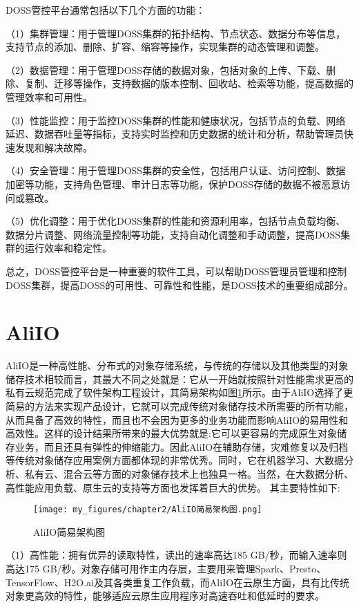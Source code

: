 DOSS管控平台通常包括以下几个方面的功能：

（1）集群管理：用于管理DOSS集群的拓扑结构、节点状态、数据分布等信息，支持节点的添加、删除、扩容、缩容等操作，实现集群的动态管理和调整。

（2）数据管理：用于管理DOSS存储的数据对象，包括对象的上传、下载、删除、复制、迁移等操作，支持数据的版本控制、回收站、检索等功能，提高数据的管理效率和可用性。

（3）性能监控：用于监控DOSS集群的性能和健康状况，包括节点的负载、网络延迟、数据吞吐量等指标，支持实时监控和历史数据的统计和分析，帮助管理员快速发现和解决故障。

（4）安全管理：用于管理DOSS集群的安全性，包括用户认证、访问控制、数据加密等功能，支持角色管理、审计日志等功能，保护DOSS存储的数据不被恶意访问或篡改。

（5）优化调整：用于优化DOSS集群的性能和资源利用率，包括节点负载均衡、数据分片调整、网络流量控制等功能，支持自动化调整和手动调整，提高DOSS集群的运行效率和稳定性。

总之，DOSS管控平台是一种重要的软件工具，可以帮助DOSS管理员管理和控制DOSS集群，提高DOSS的可用性、可靠性和性能，是DOSS技术的重要组成部分。

\section{AliIO}

AliIO是一种高性能、分布式的对象存储系统，与传统的存储以及其他类型的对象储存技术相较而言，其最大不同之处就是：它从一开始就按照针对性能需求更高的私有云规范完成了软件架构工程设计，其简易架构如图\ref{fig:/AliIO简易架构图}所示。由于AliIO选择了更简易的方法来实现产品设计，它就可以完成传统对象储存技术所需要的所有功能，从而具备了高效的特性，而且也不会因为更多的业务功能而影响AliIO的易用性和高效性。这样的设计结果所带来的最大优势就是:它可以更容易的完成原生对象储存业务，而且还具有弹性的伸缩能力。因此AliIO在辅助存储，灾难修复以及归档等传统对象储存应用案例方面都体现的非常优秀。同时，它在机器学习、大数据分析、私有云、混合云等方面的对象储存技术上也独具一格。当然，在大数据分析、高性能应用负载、原生云的支持等方面也发挥着巨大的优势。
其主要特性如下:

\begin{figure}[h]
    \centering
    \texttt{[image: my\_figures/chapter2/AliIO简易架构图.png]}
    \caption{AliIO简易架构图}
    \label{fig:/AliIO简易架构图}
\end{figure}


（1）高性能：拥有优异的读取特性，读出的速率高达185 GB/秒，而输入速率则高达175 GB/秒。对象存储可用作主内存层，主要用来管理Spark、Presto、TensorFlow、H2O.ai及其各类重复工作负载，而AliIO在云原生方面，具有比传统对象更高效的特性，能够适应云原生应用程序对高速吞吐和低延时的要求。

